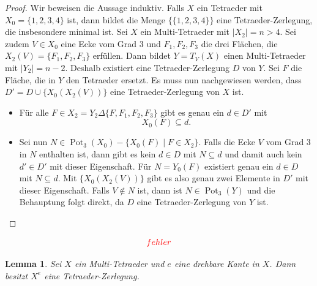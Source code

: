 \documentclass[12pt,titlepage,twoside,cleardoublepage]{article}
\theoremstyle{nummermitklammern}
\newtheorem{lemma}[temp]{Lemma}
\newtheorem{lemma}[zahl]{Lemma}
\numberwithin{equation}{section}
\DeclareMathOperator{\Pot}{Pot}
\begin{document}
\begin{proof}
Wir beweisen die Aussage induktiv. Falls $X$ ein Tetraeder mit $X_0=\{1,2,3,4\}$ ist, dann bildet die Menge $\{\{1,2,3,4\}\}$ eine Tetraeder-Zerlegung, die insbesondere minimal ist.
Sei $X$ ein Multi-Tetraeder mit $\vert X_2\vert =n > 4.$ Sei zudem $V\in X_0$ eine Ecke vom Grad 3 und $F_1,F_2,F_3$ die drei Flächen, die $X_2(V)=\{F_1,F_2,F_3\}$ erfüllen.  Dann bildet $Y=T_V(X)$ einen Multi-Tetraeder mit $\vert Y_2 \vert =n-2.$ Deshalb existiert eine Tetraeder-Zerlegung $D$ von $Y.$ Sei $F$ die Fläche, die in $Y$ den Tetraeder ersetzt. Es muss nun nachgewiesen werden, dass $D'=D\cup \{X_0(X_2(V))\}$ eine Tetraeder-Zerlegung von $X$ ist.
\begin{itemize}
\item Für alle $F\in X_2= Y_2 \Delta\{F,F_1,F_2,F_3\}$ gibt es genau ein $d\in D'$ mit 
\[
X_0(F)\subseteq d.
\] 
\item Sei nun $N\in \Pot_3(X_0)-\{X_0(F)\mid F\in X_2\}.$ Falls die Ecke $V$ vom Grad 3 in $N$ enthalten ist, 
dann gibt es kein $d\in D$ mit $N\subseteq d$ und damit auch kein $d'\in D'$ mit dieser Eigenschaft. Für $N=Y_0(F)$ existiert genau ein $d \in D$ mit $N\subseteq d.$ Mit $\{X_0(X_2(V))\}$ gibt es also genau zwei Elemente in $D'$ mit dieser Eigenschaft. Falls $V\notin N$ ist, dann ist $N\in \Pot_3(Y)$ und die Behauptung folgt direkt, da $D$ eine Tetraeder-Zerlegung von $Y$ ist.
\end{itemize}
\end{proof}
\[
\textcolor{red}{fehler}
\]
  \begin{lemma}\label{tzer}
 Sei $X$ ein Multi-Tetraeder und $e$ eine drehbare Kante in $X$. Dann besitzt $X^e$ eine Tetraeder-Zerlegung. 
 \end{lemma}
\end{document}
